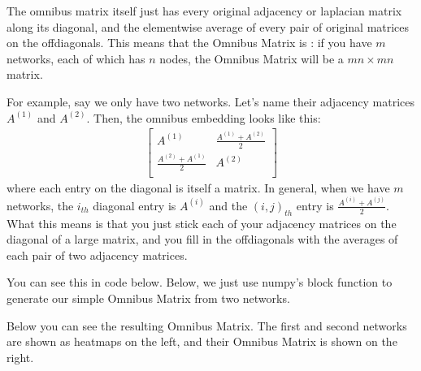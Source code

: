 \documentclass[letterpaper,10pt,english]{jupyterBook}
\begin{document}
\sphinxAtStartPar
The omnibus matrix itself just has every original adjacency or laplacian matrix along its diagonal, and the elementwise average of every pair of original matrices on the off\sphinxhyphen{}diagonals. This means that the Omnibus Matrix is : if you have \(m\) networks, each of which has \(n\) nodes, the Omnibus Matrix will be a \(mn \times mn\) matrix.

\sphinxAtStartPar
For example, say we only have two networks. Let’s name their adjacency matrices \(A^{(1)}\) and \(A^{(2)}\). Then, the omnibus embedding looks like this:
\label{equation:representations/ch6/multigraph-representation-learning:bc82a287-3c5e-42ed-85ba-d7904e618257}\begin{align}
\begin{bmatrix}
A^{(1)} & \frac{A^{(1)} + A^{(2)}}{2} \\
\frac{A^{(2)} + A^{(1)}}{2} & A^{(2)} \\
\end{bmatrix}
\end{align}
\sphinxAtStartPar
where each entry on the diagonal is itself a matrix. In general, when we have \(m\) networks, the \(i_{th}\) diagonal entry is \(A^{(i)}\) and the \((i, j)_{th}\) entry is \(\frac{A^{(i)} + A^{(j)}}{2}\). What this means is that you just stick each of your adjacency matrices on the diagonal of a large matrix, and you fill in the off\sphinxhyphen{}diagonals with the averages of each pair of two adjacency matrices.

\sphinxAtStartPar
You can see this in code below. Below, we just use numpy’s block function to generate our simple Omnibus Matrix from two networks.

\begin{sphinxVerbatim}[commandchars=\\\{\}]
   \PYG{p}{[}\PYG{p}{]} \PYG{p}{[}\PYG{p}{]}
  \PYG{p}{[}\PYG{p}{[} \PYG{p}{]}
                 \PYG{p}{[} \PYG{p}{]}\PYG{p}{]}
\end{sphinxVerbatim}

\sphinxAtStartPar
Below you can see the resulting Omnibus Matrix. The first and second networks are shown as heatmaps on the left, and their Omnibus Matrix is shown on the right.
\end{document}
